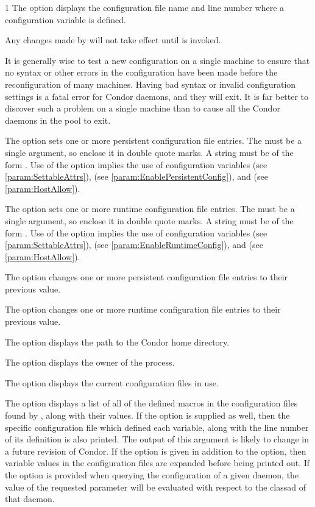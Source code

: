 \begin{ManPage}{\label{man-condor-config-val}}{1}
The  option displays the configuration
file name and line number where a configuration variable is defined.

Any changes made by  will not take effect
until  is invoked.

It is generally wise to test a new configuration on a single
machine to ensure that no syntax or other errors in the
configuration have been made before the reconfiguration of many machines.  
Having bad syntax or invalid configuration settings is a fatal error
for Condor daemons, and they will exit.
It is far better to discover such a problem on a single machine than to
cause all the Condor daemons in the pool to exit.

The  option sets one or more persistent configuration file entries.
The  must be a single argument, so enclose it in double quote marks.
A string must be of the form .
Use of the  option implies the use of configuration variables
 (see \ref{param:SettableAttrs}),
 (see \ref{param:EnablePersistentConfig}),
and  (see \ref{param:HostAllow}).

The  option sets one or more runtime configuration file entries.
The  must be a single argument, so enclose it in double quote marks.
A string must be of the form .
Use of the  option implies the use of configuration variables
 (see \ref{param:SettableAttrs}),
 (see \ref{param:EnableRuntimeConfig}),
and  (see \ref{param:HostAllow}).

The  option changes one or more persistent configuration file
entries to their previous value.

The  option changes one or more runtime configuration file
entries to their previous value.

The  option displays the path to the Condor home directory.

The  option displays the owner of the  process.

The  option displays the current configuration files in use.

The  option displays a list of all of the defined macros
in the configuration files found by , along with
their values. If the  option is supplied as well,
then the specific configuration file which defined each variable,
along with the line number of its definition is also printed. 
\Note The output of this argument is likely to change 
in a future revision of Condor.
If the  option is given in addition to the  option,
then variable values in the configuration files are expanded before
being printed out.
If the  option is provided when querying the configuration of
a given daemon, the value of the requested parameter will be evaluated with 
respect to the classad of that daemon.


\end{ManPage}
